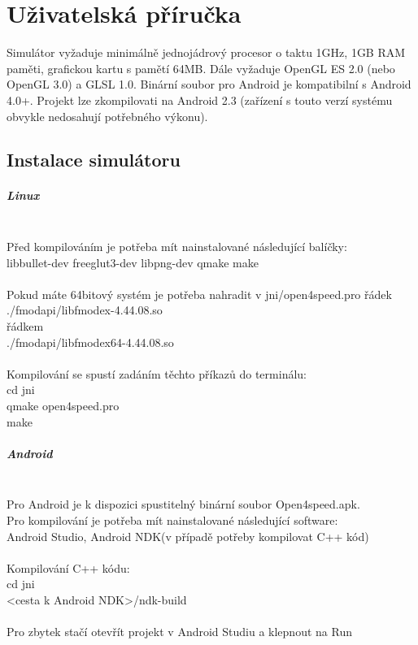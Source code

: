 \documentclass[11pt,twoside,a4paper]{book}
\begin{document}
\chapter{Uživatelská příručka}
Simulátor vyžaduje minimálně jednojádrový procesor o taktu 1GHz, 1GB RAM paměti, grafickou kartu s pamětí 64MB. Dále vyžaduje OpenGL ES 2.0 (nebo OpenGL 3.0) a GLSL 1.0. Binární soubor pro Android je kompatibilní s Android 4.0+. Projekt lze zkompilovat\linebreak i na Android 2.3 (zařízení s touto verzí systému obvykle nedosahují potřebného výkonu).

\section{Instalace simulátoru}

\paragraph{Linux}\ \ \\
Před kompilováním je potřeba mít nainstalované následující balíčky:\ \ \\
libbullet-dev freeglut3-dev libpng-dev qmake make\ \ \\
\ \ \\
Pokud máte 64bitový systém je potřeba nahradit v jni/open4speed.pro řádek\ \ \\
./fmodapi/libfmodex-4.44.08.so\ \ \\
řádkem\ \ \\
./fmodapi/libfmodex64-4.44.08.so\ \ \\
\ \ \\
Kompilování se spustí zadáním těchto příkazů do terminálu:\ \ \\
cd jni\ \ \\
qmake open4speed.pro\ \ \\
make

\paragraph{Android}\ \ \\
Pro Android je k dispozici spustitelný binární soubor Open4speed.apk.\ \ \\
Pro kompilování je potřeba mít nainstalované následující software:\ \ \\
Android Studio, Android NDK(v případě potřeby kompilovat C++ kód)\ \ \\
\ \ \\
Kompilování C++ kódu:\ \ \\
cd jni\ \ \\
<cesta k Android NDK>/ndk-build\ \ \\
\ \ \\
Pro zbytek stačí otevřít projekt v Android Studiu a klepnout na Run
\end{document}
